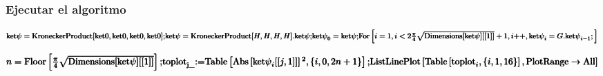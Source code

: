 \subsubsection*{Ejecutar el algoritmo}

\begin{doublespace}
\noindent\(\pmb{\text{ket$\psi $}=\text{KroneckerProduct}[\text{ket0},\text{ket0},\text{ket0},\text{ket0}];}\\
\pmb{\text{ket$\psi $}=\text{KroneckerProduct}[H,H,H,H].\text{ket$\psi $};}\\
\pmb{\text{ket$\psi $}_0=\text{ket$\psi $};}\\
\pmb{\text{For}\left[i=1,i<2\frac{\pi }{4}\sqrt{\text{Dimensions}[\text{ket$\psi $}][[1]]}+1,i\text{++},\text{ket$\psi $}_i=G.\text{ket$\psi $}_{i-1};\right]}\)
\end{doublespace}

\begin{doublespace}
\noindent\(\pmb{n=\text{Floor}\left[\frac{\pi }{4}\sqrt{\text{Dimensions}[\text{ket$\psi $}][[1]]}\right];}\\
\pmb{\text{toplot}_{\text{j$\_$}}\text{:=}\text{Table}\left[\text{Abs}\left[\text{ket$\psi $}_i[[j,1]]\right]{}^2,\{i,0,2n+1\}\right];}\\
\pmb{\text{ListLinePlot}\left[\text{Table}\left[\text{toplot}_i,\{i,1,16\}\right],\text{PlotRange}\to \text{All}\right]}\)
\end{doublespace}

%
%
%
%

